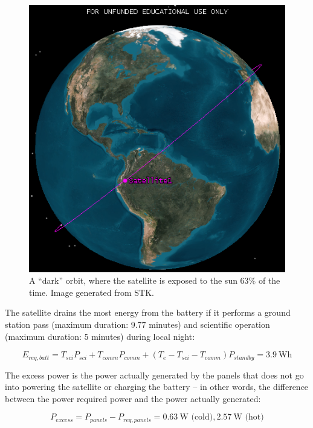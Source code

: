 \documentclass[12pt]{article}
\begin{document}
\begin{figure}[ht]%
\centering
\includegraphics{images/power-dark-orbit}%
\caption{A ``dark'' orbit, where the satellite is exposed to the sun 63\% of the time.  Image generated from STK.}%
\label{fig:power-dark-orbit}%
\end{figure}

The satellite drains the most energy from the battery if it performs a ground station pass (maximum duration: 9.77 minutes) and scientific operation (maximum duration: 5 minutes) during local night:

\begin{equation}
E_{req,batt} = T_{sci} P_{sci} + T_{comm} P_{comm} + (T_e - T_{sci} - T_{comm}) P_{standby} = 3.9 \ \text{Wh}
\label{eq:power-batt-req}
\end{equation}

The excess power is the power actually generated by the panels that does not go into powering the satellite or charging the battery -- in other words, the difference between the power required power and the power actually generated:

\begin{equation}
P_{excess} = P_{panels} - P_{req,panels} = 0.63 \ \text{W (cold)}, 2.57 \ \text{W (hot)}
\label{eq:power-excess}
\end{equation}
\end{document}
